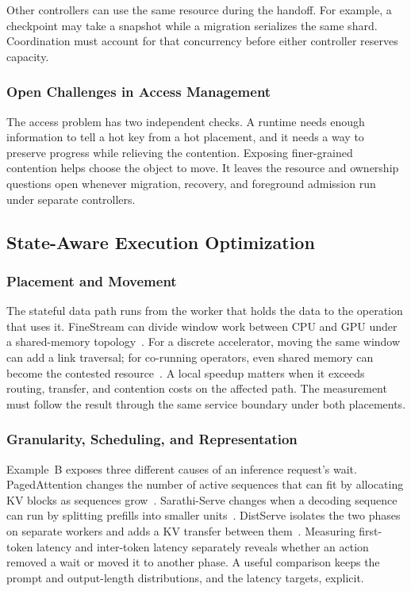 \documentclass[manuscript]{acmart}
\begin{document}
Other controllers can use the same resource during the handoff. For example, a checkpoint may take a snapshot while a migration serializes the same shard. Coordination must account for that concurrency before either controller reserves capacity.

\subsubsection{Open Challenges in Access Management}

The access problem has two independent checks. A runtime needs enough information to tell a hot key from a hot placement, and it needs a way to preserve progress while relieving the contention. Exposing finer-grained contention helps choose the object to move. It leaves the resource and ownership questions open whenever migration, recovery, and foreground admission run under separate controllers.

\subsection{State-Aware Execution Optimization}

\subsubsection{Placement and Movement}

The stateful data path runs from the worker that holds the data to the operation that uses it. FineStream can divide window work between CPU and GPU under a shared-memory topology~\cite{zhang2020finestream}. For a discrete accelerator, moving the same window can add a link traversal; for co-running operators, even shared memory can become the contested resource~\cite{zhang2016corun,zhang2016elastic}. A local speedup matters when it exceeds routing, transfer, and contention costs on the affected path. The measurement must follow the result through the same service boundary under both placements.

\subsubsection{Granularity, Scheduling, and Representation}

Example~B exposes three different causes of an inference request's wait. PagedAttention changes the number of active sequences that can fit by allocating KV blocks as sequences grow~\cite{kwon2023pagedattention}. Sarathi-Serve changes when a decoding sequence can run by splitting prefills into smaller units~\cite{agrawal2024sarathi}. DistServe isolates the two phases on separate workers and adds a KV transfer between them~\cite{zhong2024distserve}. Measuring first-token latency and inter-token latency separately reveals whether an action removed a wait or moved it to another phase. A useful comparison keeps the prompt and output-length distributions, and the latency targets, explicit.
\end{document}
